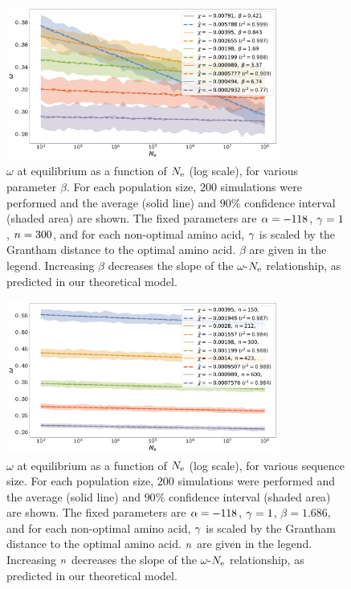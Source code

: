 \documentclass{article}
\begin{document}
\begin{figure}[H]
    \centering
    \includegraphics[width=0.8\textwidth] {SimuStab-Grantham-Beta-Elasticity.pdf}
    \caption[Effect of $\beta$ on the susceptibility]{
    $\omega$ at equilibrium as a function of $N_{\text{e}}$ (log scale), for various parameter $\beta$.
    For each population size, $200$ simulations were performed and the average (solid line) and $90\%$ confidence interval (shaded area) are shown.
    The fixed parameters are $\alpha=-118$, $\gamma=1$, $n=300$, and for each non-optimal amino acid, $\gamma$ is scaled by the Grantham distance to the optimal amino acid. $\beta$ are given in the legend.
    Increasing $\beta$ decreases the slope of the $\omega$-$N_{\text{e}}$ relationship, as predicted in our theoretical model.
    }
\end{figure}

\begin{figure}[H]
    \centering
    \includegraphics[width=0.8\textwidth] {SimuStab-Grantham-Nsite-Elasticity.pdf}
    \caption[Effect of sequence size on the susceptibility]{
    $\omega$ at equilibrium as a function of $N_{\text{e}}$ (log scale), for various sequence size.
    For each population size, $200$ simulations were performed and the average (solid line) and $90\%$ confidence interval (shaded area) are shown.
    The fixed parameters are $\alpha=-118$, $\gamma=1$, $\beta=1.686$, and for each non-optimal amino acid, $\gamma$ is scaled by the Grantham distance to the optimal amino acid. $n$ are given in the legend.
    Increasing $n$ decreases the slope of the $\omega$-$N_{\text{e}}$ relationship, as predicted in our theoretical model.
    }
\end{figure}
\end{document}
